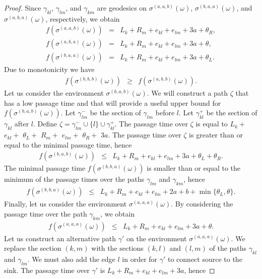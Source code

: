 \documentclass[reqno]{amsart}
\begin{document}
\begin{proof}
 Since $\gamma_{kl}$, $\gamma_{lm}$, and $\gamma_{km}$ are geodesics on $\sigma^{(a,a,b)}(\omega)$, $\sigma^{(b,a,a)}(\omega)$, and $\sigma^{(a,b,a)}(\omega)$, respectively, we obtain 
\begin{eqnarray}
f(\sigma^{(a,a,b)}(\omega))&=&L_k+R_m+e_{kl}+e_{lm}+3a+\theta_R,\label{eqn|lbS3f01}\\
f(\sigma^{(a,b,a)}(\omega))&=&L_k+R_m+e_{kl}+e_{lm}+3a+\theta,\label{eqn|lbS3f02}\\
f(\sigma^{(b,a,a)}(\omega))&=&L_k+R_m+e_{kl}+e_{lm}+3a+\theta_L.\label{eqn|lbS3f03}
\end{eqnarray}
Due to monotonicity we have 
\begin{eqnarray}
f(\sigma^{(b,b,b)}(\omega))&\geq& f(\sigma^{(a,b,b)}(\omega)). \label{eqn|lbS3f04}
\end{eqnarray}
Let us consider the environment $\sigma^{(b,a,b)}(\omega)$. We will construct a path $\zeta$ that has a low passage time and that will provide a useful upper bound for $f(\sigma^{(b,a,b)}(\omega))$.   
Let $\gamma_{lm}^-$ be the section of $\gamma_{lm}$ before $l$. Let $\gamma_{kl}^+$ be the section of $\gamma_{kl}$ after $l$. 
Define $\zeta=\gamma_{lm}^-\cup \{l\}\cup \gamma_{kl}^+$. The passage time over $\zeta$ is equal to $L_k+$ $e_{kl}+$ $\theta_L+$ $R_m+$ $e_{lm}+$ $\theta_R+$ $3a$. 
The passage time over $\zeta$ is greater than or equal to the minimal passage time, hence
\begin{eqnarray}
f(\sigma^{(b,a,b)}(\omega))&\leq&L_k+R_m+e_{kl}+e_{lm}+3a+\theta_L+\theta_R. \label{eqn|lbS3f05}
\end{eqnarray}
The minimal passage time $f(\sigma^{(b,b,a)}(\omega))$ is smaller than or equal to the minimum 
of the passage times over the paths $\gamma_{lm}$ and $\gamma_{km}$, hence
\begin{eqnarray}
f(\sigma^{(b,b,a)}(\omega))&\leq& L_k+R_m+e_{kl} +e_{lm}+2a+b+\min\{\theta_L,\theta \}.\label{eqn|lbS3f06} 
\end{eqnarray}
Finally, let us consider the environment $\sigma^{(a,a,a)}(\omega)$. By considering the passage time over the path $\gamma_{km}$, we obtain 
\begin{eqnarray}
f(\sigma^{(a,a,a)}(\omega))&\leq& L_k+R_m+e_{kl}+e_{lm}+3a+\theta.\label{eqn|lbS3f0701}
\end{eqnarray}
Let us construct an alternative path $\gamma'$ on the environment $\sigma^{(a,a,a)}(\omega)$. We replace the section $(k,m)$ with the sections $(k,l)$ and $(l,m)$ of the paths $\gamma_{kl}$ and $\gamma_{lm}$. We must also add the edge $l$ in order for $\gamma'$ to connect source to the sink. The passage time over $\gamma'$ is $L_k+R_m+e_{kl}+e_{lm}+3a$, hence 

\end{proof}
\end{document}

